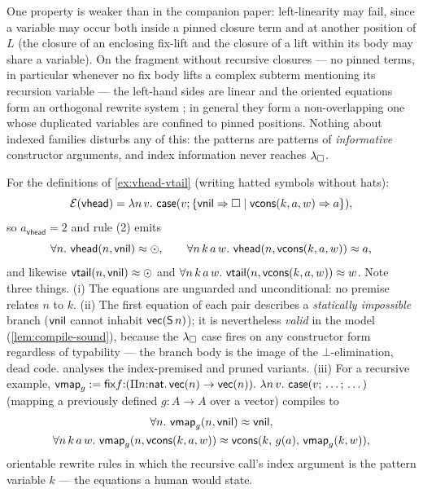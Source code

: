 \begin{remark}
One property is weaker than in the companion paper: left-linearity
may fail, since a variable may occur both inside a pinned closure
term and at another position of $L$ (the closure of an enclosing
fix-lift and the closure of a lift within its body may share a
variable).  On the fragment without recursive closures --- no pinned
terms, in particular whenever no fix body lifts a complex subterm
mentioning its recursion variable --- the left-hand sides are linear
and the oriented equations form an orthogonal rewrite system
\cite{BaaderNipkow1998}; in general they form a non-overlapping one
whose duplicated variables are confined to pinned positions.  Nothing
about indexed families disturbs any of this: the patterns are
patterns of \emph{informative} constructor arguments, and index
information never reaches $\lambda_{\square}$.
\end{remark}

\begin{example}
\label{ex:vhead-transl}
For the definitions of \cref{ex:vhead-vtail} (writing hatted symbols
without hats):
\[
  \erase{\mathsf{vhead}} = \lambda n\,v.\ \mathsf{case}(v;
    \{\csvnil \Rightarrow \bx \mid \csvcons(k,a,w) \Rightarrow a\}),
\]
so $a_{\mathsf{vhead}} = 2$ and rule (2) emits
\[
  \forall n.\ \mathsf{vhead}(n, \csvnil) \feq \prfc, \qquad
  \forall n\,k\,a\,w.\ \mathsf{vhead}(n, \csvcons(k,a,w)) \feq a,
\]
and likewise $\mathsf{vtail}(n, \mathsf{vnil}) \approx \odot$ and $\forall
n\,k\,a\,w.\ \mathsf{vtail}(n, \mathsf{vcons}(k,a,w)) \approx w$.  Note three
things.  (i) The equations are unguarded and unconditional: no premise
relates $n$ to $k$.  (ii) The first equation of each pair describes a
\emph{statically impossible} branch ($\mathsf{vnil}$ cannot inhabit
$\mathsf{vec}(\mathsf{S}\,n)$); it is nevertheless \emph{valid} in the model
(\cref{lem:compile-sound}), because the $\lambda_{\square}$ case fires on any
constructor form regardless of typability --- the branch body is the
image of the $\bot$-elimination, dead code.  
analyses the index-premised and pruned variants.  (iii) For a recursive
example, $\mathsf{vmap}_g \mathrel{:=} \mathsf{fix} f{:}(\Pi n{:}\mathsf{nat}.\,
\mathsf{vec}(n) \to \mathsf{vec}(n)).\ \lambda n\,v.\ \mathsf{case}(v;\,\dots;\,\dots)$ (mapping
a previously defined $g : A \to A$ over a vector) compiles to
\begin{gather*}
  \forall n.\ \mathsf{vmap}_g(n, \mathsf{vnil}) \approx \mathsf{vnil},\\
  \forall n\,k\,a\,w.\ \mathsf{vmap}_g(n, \mathsf{vcons}(k,a,w)) \approx
    \mathsf{vcons}(k,\, g(a),\, \mathsf{vmap}_g(k, w)),
\end{gather*}
orientable rewrite rules in which the recursive call's index argument is
the pattern variable $k$ --- the equations a human would state.
\end{example}

